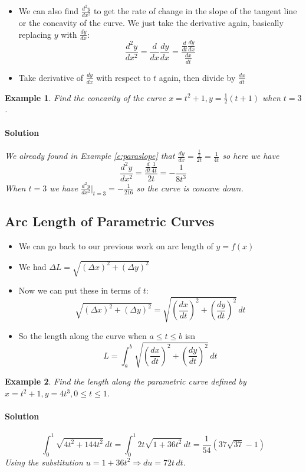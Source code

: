 \documentclass[letterpaper, 11pt, openany]{book}
\theoremstyle{mytheoremstyle}
\theoremstyle{myexamplestyle}
\newtheorem{example}{Example}[section]
\newenvironment{solution}{\paragraph{\sffamily \smaller \fontseries{b}\selectfont Solution}}{\hfill\faSquare}
\begin{document}
\begin{itemize}
    \item We can also find $\frac{d^{2}y}{dx^{2}}$ to get the rate of change in the slope of the tangent line or the concavity of the curve. We just take the derivative again, basically replacing $y$ with $\frac{dy}{dx}$:
    \[\frac{d^{2}y}{dx^{2}} = \frac{d}{dx} \frac{dy}{dx} = \frac{\frac{d}{dt} \frac{dy}{dx}}{\frac{dx}{dt}}\]
    \item Take derivative of $\frac{dy}{dx}$ with respect to $t$ again, then divide by $\frac{dx}{dt}$
\end{itemize}

\begin{example}\label{e:paraconcavity}
    Find the concavity of the curve $x = t^{2} + 1, y = \frac{1}{2}(t+1)$ when $t=3$.
    \begin{solution}
        We already found in Example \ref{e:paraslope} that $\frac{dy}{dx} = \frac{\frac{1}{2}}{2t} = \frac{1}{4t}$ so here we have
        \[\frac{d^{2}y}{dx^{2}} = \frac{\frac{d}{dt} \frac{1}{4t}}{2t} = -\frac{1}{8t^3}\]
        When $t=3$ we have $\displaystyle \frac{d^{2}y}{dx^{2}}\bigg|_{t=3} = -\frac{1}{216}$ so the curve is concave down.
    \end{solution}
\end{example}

\subsection{Arc Length of Parametric Curves}

\begin{itemize}
    \item We can go back to our previous work on arc length of $y = f(x)$
    \item We had $\Delta L = \sqrt{(\Delta x)^{2} + (\Delta y)^{2}}$
    \item Now we can put these in terms of $t$:
    \[\sqrt{(\Delta x)^{2} + (\Delta y)^{2}} = \sqrt{\left( \frac{dx}{dt} \right)^{2} + \left( \frac{dy}{dt} \right)^{2}}\, dt\]
    \item So the length along the curve when $a \leq t \leq b$ isn
    \[L = \int_{a}^{b} \sqrt{\left( \frac{dx}{dt} \right)^{2} + \left( \frac{dy}{dt} \right)^{2}}\, dt\]
\end{itemize}

\begin{example}\label{e:paralength}
    Find the length along the parametric curve defined by $x = t^{2} + 1, y = 4t^{3}, 0 \leq t \leq 1$.
    \begin{solution}
        \[\int_{0}^{1} \sqrt{4t^{2} + 144t^{2}} \, dt = \int_{0}^{1} 2t \sqrt{1 + 36t^{2}}\, dt = \frac{1}{54}\left( 37\sqrt{37} - 1 \right)\]
        Using the substitution $u = 1 + 36t^2 \Rightarrow du = 72t \, dt$.
    \end{solution}
\end{example}
\end{document}
